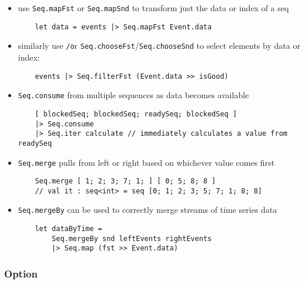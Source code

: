 \documentclass{article}
\begin{document}
\begin{itemize}

\item use \texttt{Seq.mapFst} or \texttt{Seq.mapSnd} to transform just the data or index of a seq
\begin{verbatim}
    let data = events |> Seq.mapFst Event.data
\end{verbatim}

\item similarly use \texttt/\texttt or \texttt{Seq.chooseFst}/\texttt{Seq.chooseSnd} to select elements by data or index:

\begin{verbatim}
    events |> Seq.filterFst (Event.data >> isGood)
\end{verbatim}

\item \texttt{Seq.consume} from multiple sequences as data becomes available
\begin{verbatim}
    [ blockedSeq; blockedSeq; readySeq; blockedSeq ]
    |> Seq.consume
    |> Seq.iter calculate // immediately calculates a value from readySeq
\end{verbatim}

\item \texttt{Seq.merge} pulls from left or right based on whichever value comes first
\begin{verbatim}
    Seq.merge [ 1; 2; 3; 7; 1; ] [ 0; 5; 8; 8 ]
    // val it : seq<int> = seq [0; 1; 2; 3; 5; 7; 1; 8; 8]
\end{verbatim}

\item \texttt{Seq.mergeBy} can be used to correctly merge streams of time series data
\begin{verbatim}
    let dataByTime =
        Seq.mergeBy snd leftEvents rightEvents
        |> Seq.map (fst >> Event.data)
\end{verbatim}

\end{itemize}

\subsubsection{Option}
\end{document}
